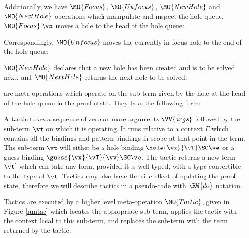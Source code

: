 \noindent
Additionally, we have $\MO{Focus}$, $\MO{Unfocus}$, $\MO{NewHole}$
and $\MO{NextHole}$
operations which manipulate and inspect
the hole queue. $\MO{Focus}\;\vn$ moves a hole to the head of the hole queue:


\noindent
Correspondingly, $\MO{Unfocus}$ moves the currently in focus hole to the
end of the hole queue:


\noindent
$\MO{NewHole}$ declares that a new hole has been created and is to be solved
next, and $\MO{NextHole}$ returns the next hole to be solved:


\noindent
{} are meta-operations which operate on the sub-term given by the
hole at the head of the hole queue in the proof state. They take the following
form:


A tactic takes a sequence of zero or more arguments $\vec{\VV{args}}$ followed
by the sub-term $\vt$ on which it is operating. It runs relative to a context
$\Gamma$ which contains all the bindings and pattern bindings in scope at that
point in the term. The sub-term $\vt$ will either be a hole binding
$\hole{\vx}{\vT}\SC\ve$ or a guess binding $\guess{\vx}{\vT}{\vv}\SC\ve$. The
tactic returns a new term $\vt'$ which can take any form, provided it is
well-typed, with a type convertible to the type of $\vt$. 
Tactics may also have the side effect of updating the proof state,
therefore we will describe tactics in a pseudo-code with $\RW{do}$ notation.

Tactics are executed by a higher level meta-operation $\MO{Tactic}$, 
given in Figure \ref{runtac} which
locates the appropriate sub-term, applies the tactic with the context
local to this sub-term, and
replaces the sub-term with the term returned by the
tactic. 

